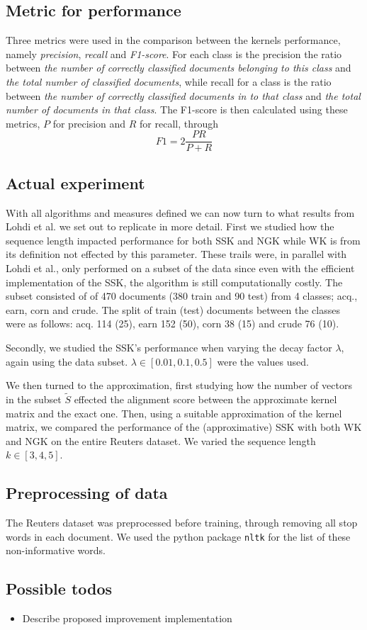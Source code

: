 \subsection{Metric for performance}
Three metrics were used in the comparison between the kernels performance, namely \textit{precision}, \textit{recall} and \textit{F1-score}. For each class is the precision the ratio between \textit{the number of correctly classified documents belonging to this class} and \textit{the total number of classified documents}, while recall for a class is the ratio between \textit{the number of correctly classified documents in to that class} and \textit{the total number of documents in that class}. The F1-score is then calculated using these metrics, $ P $ for precision and $ R $ for recall,  through 
\begin{equation*}\label{key}
F1 = 2\dfrac{PR}{P+R}
\end{equation*}

\subsection{Actual experiment}
With all algorithms and measures defined we can now turn to what results from Lohdi et al. we set out to replicate in more detail. First we studied how the sequence length impacted performance for both SSK and NGK while WK is from its definition not effected by this parameter. These trails were, in parallel with Lohdi et al., only performed on a subset of the data since even with the efficient implementation of the SSK, the algorithm is still computationally costly. The subset consisted of of 470 documents (380 train and 90 test) from  4 classes; acq., earn, corn and crude. The split of train (test) documents between the classes were as follows: acq. 114 (25), earn 152 (50), corn 38 (15) and crude 76 (10).

Secondly, we studied the SSK's performance when varying the decay factor $ \lambda $, again using the data subset. $ \lambda \in [0.01, 0.1, 0.5] $ were the values used. 

We then turned to the approximation, first studying how the number of vectors in the subset $ \tilde{S} $ effected the alignment score between the approximate kernel matrix and the exact one. Then, using a suitable approximation of the kernel matrix, we compared the performance of the (approximative) SSK with both WK and NGK on the entire Reuters dataset. We varied the sequence length $ k\in [3,4,5] $.  

\subsection{Preprocessing of data}
The Reuters dataset was preprocessed before training, through removing all stop words in each document. We used the python package \texttt{nltk} for the list of these non-informative words.


\subsection{Possible todos}
\begin{itemize}
	\item Describe proposed improvement implementation 
\end{itemize}

